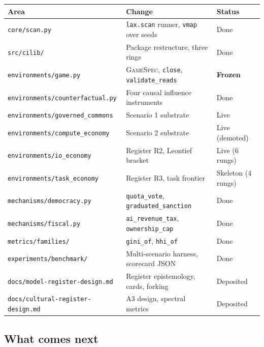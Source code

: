 \documentclass[11pt]{article}
\begin{document}
\begin{center}
\small
\begin{tabular}{@{}lp{5.3cm}l@{}}
\toprule
\textbf{Area} & \textbf{Change} & \textbf{Status} \\
\midrule
\texttt{core/scan.py} & \texttt{lax.scan} runner, \texttt{vmap} over seeds & Done \\
\texttt{src/cilib/} & Package restructure, three rings & Done \\
\texttt{environments/game.py} & \textsc{GameSpec}, \texttt{close}, \texttt{validate\_reads} & \textbf{Frozen} \\
\texttt{environments/counterfactual.py} & Four causal influence instruments & Done \\
\texttt{environments/governed\_commons} & Scenario 1 substrate & Live \\
\texttt{environments/compute\_economy} & Scenario 2 substrate & Live (demoted) \\
\texttt{environments/io\_economy} & Register R2, Leontief bracket & Live (6 rungs) \\
\texttt{environments/task\_economy} & Register R3, task frontier & Skeleton (4 rungs) \\
\texttt{mechanisms/democracy.py} & \texttt{quota\_vote}, \texttt{graduated\_sanction} & Done \\
\texttt{mechanisms/fiscal.py} & \texttt{ai\_revenue\_tax}, \texttt{ownership\_cap} & Done \\
\texttt{metrics/families/} & \texttt{gini\_of}, \texttt{hhi\_of} & Done \\
\texttt{experiments/benchmark/} & Multi-scenario harness, scorecard JSON & Done \\
\texttt{docs/model-register-design.md} & Register epistemology, cards, forking & Deposited \\
\texttt{docs/cultural-register-design.md} & A3 design, spectral metrics & Deposited \\
\bottomrule
\end{tabular}
\end{center}

\subsection{What comes next}
\end{document}

